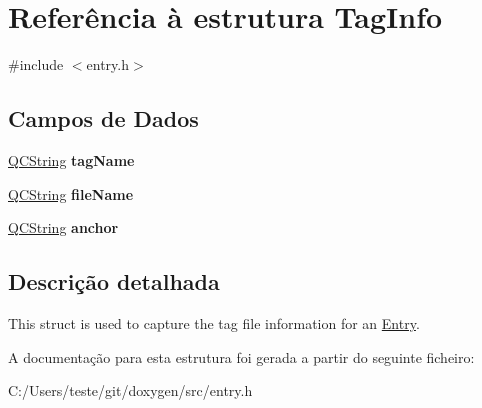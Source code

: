 \hypertarget{struct_tag_info}{\section{Referência à estrutura Tag\-Info}
\label{struct_tag_info}
}


{\ttfamily \#include $<$entry.\-h$>$}

\subsection*{Campos de Dados}
\begin{DoxyCompactItemize}
\item 
\hypertarget{struct_tag_info_a4cf94f81e81e70bfb1a47e8630858af6}{\hyperlink{class_q_c_string}{Q\-C\-String} {\bfseries tag\-Name}}\label{struct_tag_info_a4cf94f81e81e70bfb1a47e8630858af6}

\item 
\hypertarget{struct_tag_info_abb9cd3e430c4eaf05aa259fa96f32305}{\hyperlink{class_q_c_string}{Q\-C\-String} {\bfseries file\-Name}}\label{struct_tag_info_abb9cd3e430c4eaf05aa259fa96f32305}

\item 
\hypertarget{struct_tag_info_a77f4824b029885f469aa2903eabf92d4}{\hyperlink{class_q_c_string}{Q\-C\-String} {\bfseries anchor}}\label{struct_tag_info_a77f4824b029885f469aa2903eabf92d4}

\end{DoxyCompactItemize}


\subsection{Descrição detalhada}
This struct is used to capture the tag file information for an \hyperlink{class_entry}{Entry}. 

A documentação para esta estrutura foi gerada a partir do seguinte ficheiro\-:\begin{DoxyCompactItemize}
\item 
C\-:/\-Users/teste/git/doxygen/src/entry.\-h\end{DoxyCompactItemize}
